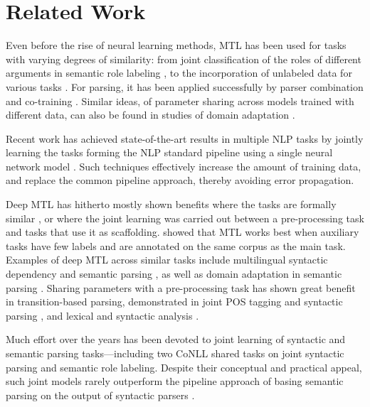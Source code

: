 \documentclass[11pt,a4paper]{article}
\newcommand{\oa}[1]{\footnote{\color{red}OA: #1}}
\begin{document}
\section{Related Work}\label{sec:related_work}
Even before the rise of neural learning methods,
MTL has been used for tasks with varying degrees of similarity:
from joint classification of the roles of different arguments in semantic role labeling \cite{toutanova2005joint}, 
to the incorporation of unlabeled data for various tasks \cite{ando2005framework}.
For parsing, it has been applied successfully by
parser combination and co-training \cite{mcclosky2010automatic,baucom2013domain}.
Similar ideas, of parameter sharing across models trained with different data,
can also be found in studies of domain adaptation \cite{W06-1615,P07-1033,K17-1040}.

Recent work has achieved state-of-the-art results in multiple NLP tasks
by jointly learning the tasks forming the NLP standard pipeline using 
a single neural network model \cite{collobert2011natural,D17-1206}.
Such techniques effectively increase the amount of training data,
and replace the common pipeline approach, thereby avoiding error propagation.

Deep MTL has hitherto mostly shown benefits where the tasks
are formally similar \cite{P15-1166,P16-2038,D17-1134},
or where the joint learning was carried out between a pre-processing task and tasks that use it
as scaffolding.
\citet{E17-1005} showed that MTL works best when auxiliary tasks have few labels
and are annotated on the same corpus as the main task.
Examples of deep MTL across similar tasks include 
multilingual syntactic dependency \cite{Q16-1031,guo2016exploiting}
and semantic parsing \cite{duong2017multilingual},
as well as domain adaptation in semantic parsing \cite{herzig-berant:2017:Short,W17-2607}.
Sharing parameters with a pre-processing task
has shown great benefit in transition-based parsing, demonstrated in
joint POS tagging and syntactic parsing
\cite{bohnet2012transition,Zhang2016StackpropagationIR}, and
lexical and syntactic analysis \cite{constant-nivre:2016:P16-1,more2016joint}.

Much effort over the years has been devoted to joint learning of syntactic
and semantic parsing tasks---including
two CoNLL shared tasks \cite{surdeanu2008conll,hajivc2009conll} on joint syntactic
parsing and semantic role labeling.
Despite their conceptual and practical appeal, such joint models rarely outperform
the pipeline approach of basing semantic parsing on the output of syntactic parsers
\cite{lluis2008joint,henderson2013multilingual,D15-1169,swayamdipta-EtAl:2016:CoNLL}.
\end{document}
